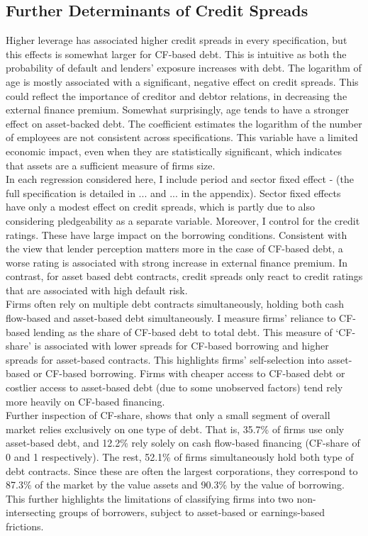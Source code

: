 \documentclass[12pt]{article}
\begin{document}
\subsection{Further Determinants of Credit Spreads\label{sec:credit spreads}}
Higher leverage has associated higher credit spreads in every specification, but this effects is somewhat larger for CF-based debt. This is intuitive as both the probability of default and lenders' exposure increases with debt. The logarithm of age is mostly associated with a significant, negative effect on credit spreads. This could reflect the importance of creditor and debtor relations, in decreasing the external finance premium. Somewhat surprisingly, age tends to have a stronger effect on asset-backed debt. The coefficient estimates the logarithm of the number of employees are not consistent across specifications. This variable have a limited economic impact, even when they are statistically significant, which indicates that assets are a sufficient measure of firms size. \vspace{3mm} \\
In each regression considered here, I include period and sector fixed effect - (the full specification is detailed in ... and ... in the appendix). Sector fixed effects have only a modest effect on credit spreads, which is partly due to also considering pledgeability as a separate variable. Moreover, I control for the credit ratings. These have large impact on the borrowing conditions. Consistent with the view that lender perception matters more in the case of CF-based debt, a worse rating is associated with strong increase in external finance premium. In contrast, for asset based debt contracts, credit spreads only react to credit ratings that are associated with high default risk.  \vspace{3mm} \\
Firms often rely on multiple debt contracts simultaneously, holding both cash flow-based and asset-based debt simultaneously. I measure firms' reliance to CF-based lending as the share of CF-based debt to total debt. This measure of `CF-share' is associated with lower spreads for CF-based borrowing and higher spreads for asset-based contracts. This highlights firms' self-selection into asset-based or CF-based borrowing. Firms with cheaper access to CF-based debt or costlier access to asset-based debt (due to some unobserved factors) tend rely more heavily on CF-based financing. \vspace{3mm} \\
Further inspection of CF-share, shows that only a small segment of overall market relies exclusively on one type of debt. That is, 35.7\% of firms use only asset-based debt, and 12.2\% rely solely on cash flow-based financing (CF-share of 0 and 1 respectively). The rest, 52.1\% of firms simultaneously hold both type of debt contracts. Since these are often the largest corporations, they correspond to 87.3\% of the market by the value assets and 90.3\% by the value of borrowing. This further highlights the limitations of classifying firms into two non-intersecting groups of borrowers, subject to asset-based or earnings-based frictions.
\end{document}
